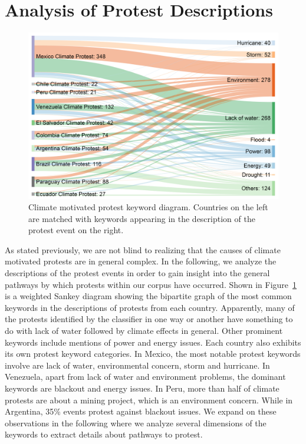 \documentclass[9pt,twocolumn,twoside]{pnas-new}
\begin{document}
\section{Analysis of Protest Descriptions}
\begin{figure}[t]
\centerline
{\includegraphics[width=.4\textwidth]{figures/causality1}}
\caption{Climate motivated protest keyword diagram. Countries on the left are matched with keywords appearing in the description of the protest event on the right.}
\label{causality}
\end{figure}


As stated previously, we are not blind to realizing that the causes of climate motivated protests are in general complex.
In the following, we analyze the descriptions of the protest events in order to gain insight into the general pathways by which protests within our corpus have occurred.
Shown in Figure~\ref{causality} is a weighted Sankey diagram showing the bipartite graph of the most common keywords in the descriptions of protests from each country.
Apparently, many of the protests identified by the classifier in one way or another have something to do with lack of water followed by climate effects in general.
Other prominent keywords include mentions of power and energy issues.
Each country also exhibits its own protest keyword categories.
In Mexico, the most notable protest keywords involve are lack of water, environmental concern, storm and hurricane.
In Venezuela, apart from lack of water and environment problems, the dominant keywords are blackout and energy issues.
In Peru, more than half of climate protests are about a mining project, which is an environment concern.
While in Argentina, 35\% events protest against blackout issues.
We expand on these observations in the following where we analyze several dimensions of the keywords to extract details about pathways to protest.
\end{document}
